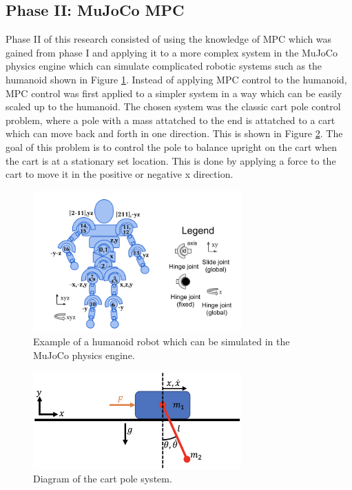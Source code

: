 \documentclass{./springer/svjour3}
\begin{document}
\subsection{Phase II: MuJoCo MPC}
Phase II of this research consisted of using the knowledge of MPC which was gained from phase I and applying it to a more complex system in the MuJoCo physics engine which can 
simulate complicated robotic systems such as the humanoid shown in Figure \ref{fig:humanoid}. Instead of applying MPC control to the humanoid, MPC control was first applied to a simpler system 
in a way which can be easily scaled up to the humanoid. The chosen system was the classic cart pole control problem, where a pole with a 
mass attatched to the end is attatched to a cart which can move back and forth in one direction. This is shown in Figure \ref{fig:cartpole}. The goal of this problem is to 
control the pole to balance upright on the cart when the cart is at a stationary set location. This is done by applying a force to the cart to move it in the positive or 
negative x direction.

\begin{figure}[!h]
  \centering
  \includegraphics[width=8cm]{./figures/humanoid.png}
  \caption{Example of a humanoid robot which can be simulated in the MuJoCo physics engine.}
  \label{fig:humanoid} 
\end{figure}

\begin{figure}[!h]
  \centering
  \includegraphics[width=8cm]{./figures/cartpole-dynamics.png}
  \caption{Diagram of the cart pole system.}
  \label{fig:cartpole} 
\end{figure}
\end{document}
